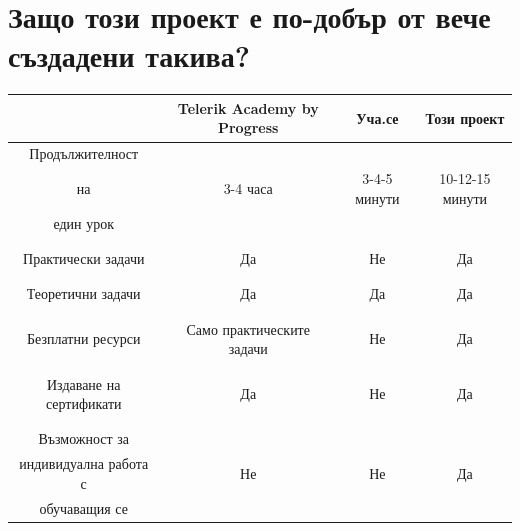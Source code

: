 \documentclass[28pt]{article}
\begin{document}
\section{Защо този проект е по-добър от вече създадени такива?}
\begin{table}[ht]
	\centering
	\resizebox{\textwidth}{!}
	{
		\begin{tabular}{c|c|c|c}
			 & \foreignlanguage{english}{Telerik Academy by Progress} & Уча.се & Този проект\\
			\hline
			Продължителност & & & \\ 
			на & 3-4 часа & 3-4-5 минути & 10-12-15 минути \\ 
			един урок & & &\\
			 & & &\\
			\hline
			 & & &\\
			Практически задачи & Да & Не & Да \\ 
			 & & &\\
			\hline
			 & & &\\
			Теоретични задачи & Да & Да & Да \\ 
			 & & &\\
			\hline
			 & & &\\
			Безплатни ресурси & Само практическите задачи & Не & Да \\ 
			 & & &\\
			\hline
			 & & &\\
			 Издаване на сертификати & Да & Не & Да \\
			 & & &\\
			 \hline
			 & & &\\
			Възможност за & & & \\ 
			индивидуална работа с & Не & Не & Да \\
			обучаващия се & & &\\ 
			\hline
			
		\end{tabular}
	}
\end{table}
\newpage
\end{document}
